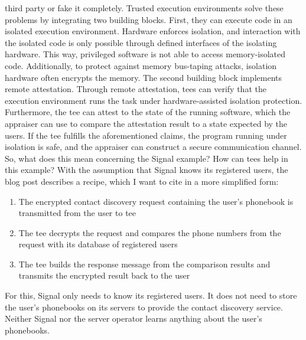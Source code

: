 third party or fake it completely. Trusted execution environments solve these
problems by integrating two building blocks. First, they can execute code in an
isolated execution environment. Hardware enforces isolation, and interaction
with the isolated code is only possible through defined interfaces of the
isolating hardware. This way, privileged software is not able to access
memory-isolated code. Additionally, to protect against memory bus-taping
attacks, isolation hardware often encrypts the memory. The second building block
implements remote attestation. Through remote attestation, \glspl{tee} can
verify that the execution environment runs the task under hardware-assisted
isolation protection. Furthermore, the \gls{tee} can attest to the state of the
running software, which the appraiser can use to compare the attestation result
to a state expected by the users. If the \gls{tee} fulfills the aforementioned
claims, the program running under isolation is safe, and the appraiser can
construct a secure communication channel.\\

So, what does this mean concerning the Signal example? How can \glspl{tee}
help in this example? With the assumption that Signal knows its registered
users, the blog post describes a recipe, which I want to cite in a more
simplified form:
\begin{enumerate}
  \item The encrypted contact discovery request containing the user's phonebook
    is transmitted from the user to
    \gls{tee}
  \item The \gls{tee} decrypts the request and compares the phone numbers from
    the request with its database of registered users
  \item The \gls{tee} builds the response message from the comparison results
    and transmits the encrypted result back to the user
\end{enumerate}
For this, Signal only needs to know its registered users. It does not need to
store the user's phonebooks on its servers to provide the contact discovery
service. Neither Signal nor the server operator learns anything about the user's
phonebooks.

